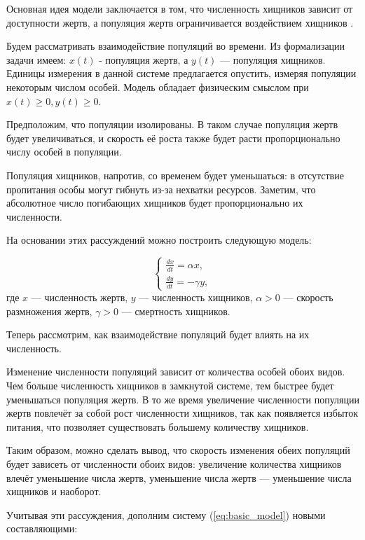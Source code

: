 Основная идея модели заключается в том, что численность хищников зависит от доступности жертв, а популяция жертв ограничивается воздействием хищников \cite{bratush2010}.

Будем рассматривать взаимодействие популяций во времени. 
Из формализации задачи имеем: $x(t)$ - популяция жертв, а $y(t)$ — популяция хищников. 
Единицы измерения в данной системе предлагается опустить, измеряя популяции некоторым числом особей. 
Модель обладает физическим смыслом при $x(t) \ge 0, y(t) \ge 0$.

Предположим, что популяции изолированы. 
В таком случае популяция жертв будет увеличиваться, и скорость её роста также будет расти пропорционально числу особей в популяции.

Популяция хищников, напротив, со временем будет уменьшаться: в отсутствие пропитания особы могут гибнуть из-за нехватки ресурсов. 
Заметим, что абсолютное число погибающих хищников будет пропорционально их численности.

На основании этих рассуждений можно построить следующую модель:

\begin{equation}
	\begin{cases}
		\frac{dx}{dt} = \alpha x, \\
		\frac{dy}{dt} = -\gamma y,
	\end{cases}
	\label{eq:basic_model}
\end{equation}
где $x$ — численность жертв, $y$ — численность хищников, $\alpha > 0$ — скорость размножения жертв, $\gamma > 0$ — смертность хищников.

Теперь рассмотрим, как взаимодействие популяций будет влиять на их численность.

Изменение численности популяций зависит от количества особей обоих видов. 
Чем больше численность хищников в замкнутой системе, тем быстрее будет уменьшаться популяция жертв. 
В то же время увеличение численности популяции жертв повлечёт за собой рост численности хищников, так как появляется избыток питания, что позволяет существовать большему количеству хищников.

Таким образом, можно сделать вывод, что скорость изменения обеих популяций будет зависеть от численности обоих видов: увеличение количества хищников влечёт уменьшение числа жертв, уменьшение числа жертв — уменьшение числа хищников и наоборот.

Учитывая эти рассуждения, дополним систему (\ref{eq:basic_model}) новыми составляющими:

